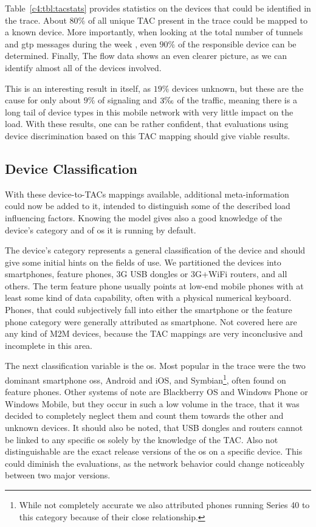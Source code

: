Table~\ref{c4:tbl:tacstats} provides statistics on the devices that could be identified in the trace. About $80\%$ of all unique \gls{TAC} present in the trace could be mapped to a known device. 
More importantly, when looking at the total number of tunnels and \gls{gtp} messages during the week
, even $90\%$ of the responsible device can be determined. Finally, The flow data shows an even clearer picture, as we can identify almost all of the devices involved.

This is an interesting result in itself, as $19\%$ devices unknown, but these are the cause for only about $9\%$ of signaling and $3\text{\textperthousand}$ of the traffic, meaning there is a long tail of device types in this mobile network with very little impact on the load. With these results, one can be rather confident, that evaluations using device discrimination based on this \gls{TAC} mapping should give viable results.


\subsection{Device Classification}

With these device-to-\glspl{TAC} mappings available, additional meta-information could now be added to it, intended to distinguish some of the described load influencing factors. Knowing the model gives also a good knowledge of the device's category and of \gls{os} it is running by default.

The device's category represents a general classification of the device and should give some initial hints on the fields of use. We partitioned the devices into smartphones, feature phones, \gls{3G} USB dongles or \gls{3G}+WiFi routers, and all others. The term feature phone usually points at low-end mobile phones with at least some kind of data capability, often with a physical numerical keyboard. Phones, that could subjectively fall into either the smartphone or the feature phone category were generally attributed as smartphone. Not covered here are any kind of \gls{M2M} devices, because the \gls{TAC} mappings are very inconclusive and incomplete in this area.

The next classification variable is the \gls{os}. Most popular in the trace were the two dominant smartphone \glspl{os}, Android and iOS, and Symbian\footnote{While not completely accurate we also attributed phones running Series 40 to this category because of their close relationship.}, often found on feature phones. Other systems of note are Blackberry OS and Windows Phone or Windows Mobile, but they occur in such a low volume in the trace, that it was decided to completely neglect them and count them towards the other and unknown devices. It should also be noted, that USB dongles and routers cannot be linked to any specific \gls{os} solely by the knowledge of the \gls{TAC}. Also not distinguishable are the exact release versions of the \gls{os} on a specific device. This could diminish the evaluations, as the network behavior could change noticeably between two major versions.

